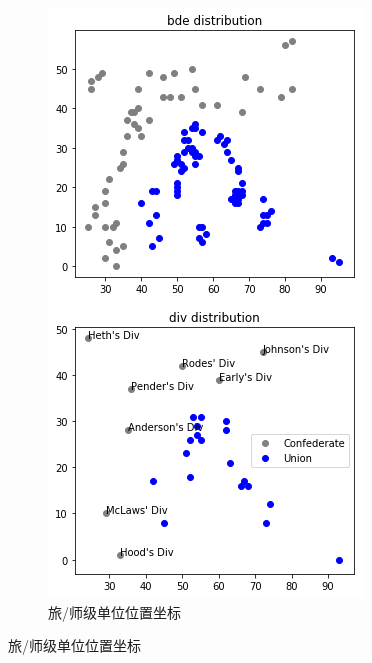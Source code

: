 \documentclass{beamer}
\begin{document}
\begin{frame}
\begin{figure}[htb]
\begin{subfigure}[b]{0.26\linewidth}
    \includegraphics[width=\linewidth]{gettysburg-model.png}
    \caption{旅/师级单位位置坐标}
  \end{subfigure}
  \label{fig:gettysburg}
\end{figure}

\end{frame}
\end{document}
